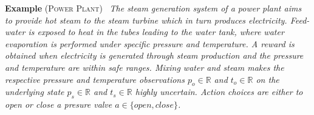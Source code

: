 \documentclass{article} %
\newcommand{\open}{\mathit{open}}
\newcommand{\close}{\mathit{close}}
\begin{document}

\textbf{Example} \textsc{(Power Plant)~\cite{steam2}} \emph{The steam
generation system of a power plant aims to provide hot steam to the
steam turbine which in turn produces electricity. Feed-water is
exposed to heat in the tubes leading to the water tank, where water
evaporation is performed under specific pressure and temperature.
A reward is obtained when electricity is generated through steam
production and the pressure and temperature are within safe ranges.
Mixing water and steam makes the
respective pressure and temperature observations $p_o \in \mathbb{R}$
and $t_o \in \mathbb{R}$ on the underlying state $p_s \in \mathbb{R}$
and $t_s \in \mathbb{R}$ highly uncertain.  Action choices are either
to open or close a presure valve $a \in \{ \open, \close \}$.}
\end{document}
